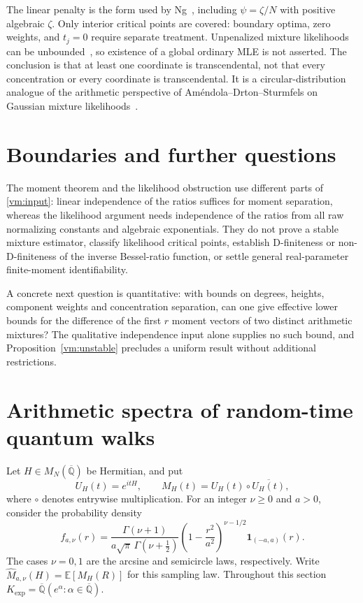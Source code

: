 \documentclass[11pt]{article}
\theoremstyle{definition}
\theoremstyle{remark}
\newcommand{\Qa}{\overline{\mathbb Q}}
\newcommand{\Kexp}{K_{\mathrm{exp}}}
\newcommand{\Ex}{\mathbb E}
\begin{document}
The linear penalty is the form used by Ng~\cite[Section 4.3]{Ng},
including $\psi=\zeta/N$ with positive algebraic $\zeta$.
Only interior critical points are covered: boundary optima, zero
weights, and $t_j=0$ require separate treatment.  Unpenalized mixture
likelihoods can be unbounded~\cite[Theorem 3.1]{Ng}, so existence of a
global ordinary MLE is not asserted.  The conclusion is that at least
one coordinate is transcendental, not that every concentration or every
coordinate is transcendental.  It is a circular-distribution analogue
of the arithmetic perspective of Am\'endola--Drton--Sturmfels
on Gaussian mixture likelihoods~\cite{ADS}.

\section{Boundaries and further questions}

The moment theorem and the likelihood obstruction use different parts
of \eqref{vm:input}: linear independence of the ratios suffices for
moment separation, whereas the likelihood argument needs independence
of the ratios from all raw normalizing constants and algebraic
exponentials.  They do not prove a stable mixture estimator, classify
likelihood critical points, establish D-finiteness or non-D-finiteness
of the inverse Bessel-ratio function, or settle general real-parameter
finite-moment identifiability.

A concrete next question is quantitative: with bounds on degrees,
heights, component weights and concentration separation, can one give
effective lower bounds for the difference of the first $r$ moment
vectors of two distinct arithmetic mixtures?  The qualitative
independence input alone supplies no such bound, and
Proposition~\ref{vm:unstable} precludes a uniform result without
additional restrictions.


\section{Arithmetic spectra of random-time quantum walks}
\label{qmix:section}

Let $H\in M_N(\Qa)$ be Hermitian, and put
\[
 U_H(t)=e^{itH},\qquad
 M_H(t)=U_H(t)\circ\overline{U_H(t)},
\]
where $\circ$ denotes entrywise multiplication. For an integer $\nu\ge0$
and $a>0$, consider the probability density
\begin{equation}
\label{qmix:density}
 f_{a,\nu}(r)=
 \frac{\Gamma(\nu+1)}{a\sqrt\pi\,\Gamma(\nu+\tfrac12)}
 \left(1-\frac{r^2}{a^2}\right)^{\nu-1/2}
 \mathbf1_{(-a,a)}(r).
\end{equation}
The cases $\nu=0,1$ are the arcsine and semicircle laws, respectively.
Write $\widehat M_{a,\nu}(H)=\Ex[M_H(R)]$ for this sampling law.
Throughout this section $\Kexp=\Qa(e^\alpha:\alpha\in\Qa)$.
\end{document}

